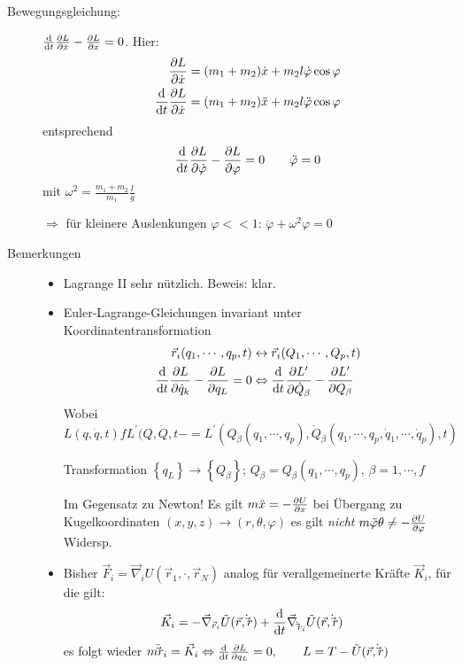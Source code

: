 \begin{enumerate}
\begin{description}
\item[Bewegungsgleichung:]
  $\frac{\text{d} }{\text{d} t}\frac{\partial L}{\partial \dot{x}} - \frac{\partial 
    L}{\partial x} = 0$.
  Hier:
\begin{align*}
  \frac{\partial L}{\partial \dot{x}}
  &= (m_1+m_2)\dot{x}+m_2l\dot{\varphi}\cos\varphi\\
  \frac{\text{d} }{\text{d} t}\frac{\partial L}{\partial \dot{x}}
  &= (m_1+m_2)\ddot{x} + m_2l\ddot{\varphi}\cos\varphi\\
\end{align*}
entsprechend
\begin{equation*}
\frac{\text{d} }{\text{d} t}\frac{\partial L}{\partial \dot{\varphi}}-\frac{\partial L}{\partial \varphi} = 0
\qquad \ddot{\varphi} = 0
\end{equation*}
mit $\omega^2=\frac{m_1+m_2}{m_1}\frac{l}{g}$

$\Rightarrow$ für kleinere Auslenkungen $\varphi<<1$: $\ddot{\varphi}+\omega^2\varphi=0$

\item[Bemerkungen]
\begin{itemize}
\item Lagrange II sehr nützlich. Beweis: klar.
\item Euler-Lagrange-Gleichungen invariant unter
  Koordinatentransformation
  \begin{align*}
    \vec{r}_i(q_1,\cdots,q_p,t)
    &\leftrightarrow \vec{r}_i(Q_1,\cdots,Q_p,t)\\
    \frac{\text{d} }{\text{d} t}\frac{\partial L}{\partial \dot{q}_k}-\frac{\partial L}{\partial q_L} = 0
    &\Leftrightarrow \frac{\text{d} }{\text{d} t} \frac{\partial L^{\prime}}{\partial \dot{Q}_{\beta}}
      - \frac{\partial L^{\prime}}{\partial Q_{\beta}}
  \end{align*}
  Wobei
  $L(q,\dot{q},t) f L^{\prime}(Q,\dot{Q},t- =
  L^{\prime}(Q_{\beta}(q_1,\cdots,q_p),\dot{Q}_{\beta}(q_1,\cdots,q_p,
  \dot{q}_1,\cdots,\dot{q}_p),t)$

  Transformation
  $\left\{ q_L \right\} \rightarrow \left\{ Q_{\beta} \right\}$;
  $Q_{\beta}=Q_{\beta}(q_1,\cdots,q_p)$, $\beta = 1,\cdots,f$

  Im Gegensatz zu Newton!  Es gilt
  $m\ddot{x} = - \frac{\partial U}{\partial x}$ bei Übergang zu
  Kugelkoordinaten $(x,y,z)\rightarrow(r,\theta,\varphi)$ es gilt
  \emph{nicht}
  $m\ddot{\varphi} \theta \not= - \frac{\partial U}{\partial \varphi}$ Widersp.
\item Bisher $\vec{F}_i = \vec{\nabla}_iU(\vec{r}_1,\cdot,\vec{r}_N)$
  analog für verallgemeinerte Kräfte $\vec{K}_i$, für die gilt:
  \begin{align*}
    \vec{K}_i &= -\vec{\nabla}_{\vec{r}_i}\tilde{U}(\vec{r},\dot\vec{r})
                + \frac{\text{d} }{\text{d} t}\vec{\nabla}_{\dot\vec{r}_i} \tilde{U}(\vec{r},\dot\vec{r})
  \end{align*}
  es folgt wieder
  $m\ddot\vec{r}_i = \vec{K}_{i} \Leftrightarrow
  \frac{\text{d} }{\text{d} t}\frac{\partial L}{\partial q_L} = 0, \qquad L = T -
  \tilde{U}(\vec{r},\dot\vec{r})$


\end{itemize}
\end{description}
\end{enumerate}
